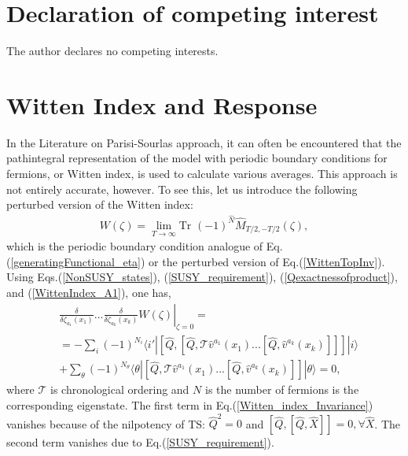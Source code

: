 \documentclass[final,5p,10pt,times,twocolumn,year]{elsarticle}
\begin{document}
\section*{Declaration of competing interest}
The author declares no competing interests.

\appendix

\section{Witten Index and Response}
\label{WittenIndexButterflyEffect}
In the Literature on Parisi-Sourlas approach, it can often be encountered that the pathintegral representation of the model with periodic boundary conditions for fermions, or Witten index, is used to calculate various averages. This approach is not entirely accurate, however. To see this, let us introduce the following perturbed version of the Witten index:
\begin{eqnarray}
    W(\zeta) = \lim_{T\to\infty} \text{Tr } (-1)^{\hat N}\hat M_{T/2, -T/2}(\zeta),\label{WittenIndex_A1}
\end{eqnarray}
which is the periodic boundary condition analogue of Eq.(\ref{generatingFunctional_eta}) or the perturbed version of Eq.(\ref{WittenTopInv}). Using Eqs.(\ref{NonSUSY_states}), (\ref{SUSY_requirement}), (\ref{Qexactnessofproduct}), and (\ref{WittenIndex_A1}), one has,
\begin{eqnarray}
    & \left.\frac{\delta }{\delta\zeta_{a_1}(x_1)}...\frac{\delta }{\delta\zeta_{a_k}(x_k)} W(\zeta)\right|_{\zeta=0}  = \nonumber \\
    &=-\sum_{i} (-1)^{N_{i}} \langle i' |[\hat Q, [\hat Q, \mathcal{T}\hat v^{a_1}(x_1) ... [\hat Q, \hat v^{a_k}(x_k)]]]| i \rangle  \nonumber \\ 
    &+ \sum_{\theta} (-1)^{N_\theta} \langle \theta | [\hat Q, \mathcal{T} \hat v^{a_1}(x_1) ... [\hat Q, \hat v^{a_k}(x_k)]] |\theta \rangle =0, \label{Witten_index_Invariance}
\end{eqnarray}
where $\mathcal{T}$ is chronological ordering and $N$ is the number of fermions is the corresponding eigenstate. The first term in Eq.(\ref{Witten_index_Invariance}) vanishes because of the nilpotency of TS: $\hat Q^2=0$ and $[\hat Q, [\hat Q, \hat X]]=0, \forall \hat X$. The second term vanishes due to Eq.(\ref{SUSY_requirement}).
\end{document}
